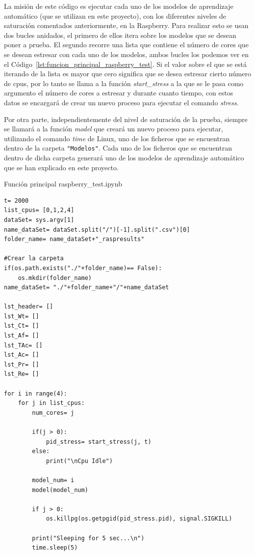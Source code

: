\documentclass[a4paper, 12pt]{book}
\begin{document}
La misión de este código es ejecutar cada uno de los modelos de aprendizaje automático (que se utilizan en este proyecto), con los diferentes niveles de saturación comentados anteriormente, en la Raspberry. Para realizar esto se usan dos bucles anidados, el primero de ellos itera sobre los modelos que se desean poner a prueba. El segundo recorre una lista que contiene el número de cores que se desean estresar con cada uno de los modelos, ambos bucles los podemos ver en el Código~\ref{lst:funcion_principal_raspberry_test}. Si el valor sobre el que se está iterando de la lista es mayor que cero significa que se desea estresar cierto número de cpus, por lo tanto se llama a la función \textit{start\_stress} a la que se le pasa como argumento el número de cores a estresar y durante cuanto tiempo, con estos datos se encargará de crear un nuevo proceso para ejecutar el comando \textit{stress}.

Por otra parte, independientemente del nivel de saturación de la prueba, siempre se llamará a la función \textit{model} que creará un nuevo proceso para ejecutar, utilizando el comando \textit{time} de Linux, uno de los ficheros que se encuentran dentro de la carpeta \texttt{"Modelos"}. Cada uno de los ficheros que se encuentran dentro de dicha carpeta generará uno de los modelos de aprendizaje automático que se han explicado en este proyecto. 

\begin{listing}[]
    \caption{Función principal raspberry\_test.ipynb}{}
    \label{lst:funcion_principal_raspberry_test}
    \begin{verbatim}
t= 2000
list_cpus= [0,1,2,4]
dataSet= sys.argv[1]
name_dataSet= dataSet.split("/")[-1].split(".csv")[0]
folder_name= name_dataSet+"_raspresults"

#Crear la carpeta
if(os.path.exists("./"+folder_name)== False):
    os.mkdir(folder_name)
name_dataSet= "./"+folder_name+"/"+name_dataSet

lst_header= []
lst_Wt= []
lst_Ct= []
lst_Af= []
lst_TAc= []
lst_Ac= []
lst_Pr= []
lst_Re= []

for i in range(4):
    for j in list_cpus:
        num_cores= j
        
        if(j > 0):
            pid_stress= start_stress(j, t)
        else:
            print("\nCpu Idle")
            
        model_num= i    
        model(model_num)
        
        if j > 0:
            os.killpg(os.getpgid(pid_stress.pid), signal.SIGKILL)
        
        print("Sleeping for 5 sec...\n")
        time.sleep(5)
    \end{verbatim}
\end{listing}
\end{document}
